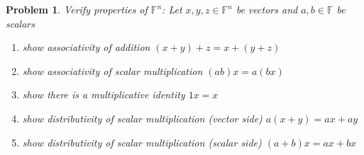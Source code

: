 \documentclass{article}
\theoremstyle{problemstyle}
\newtheorem{problem}{Problem}
\theoremstyle{problemstyle}
\begin{document}
\begin{problem}
Verify properties of $\mathbb{F}^n$: 
Let $x,y,z\in\mathbb{F}^n$ be vectors and $a,b\in\mathbb{F}$ be scalars
\begin{enumerate}
\item show associativity of addition $(x+y)+z = x+(y+z)$
\item show associativity of scalar multiplication $(ab)x = a(bx)$
\item show there is a multiplicative identity $1x=x$ 
\item show distributivity of scalar multiplication (vector side) $a(x+y) = ax + ay$
\item show distributivity of scalar multiplication (scalar side)  $(a+b)x = ax + bx$
\end{enumerate}
\end{problem}
\end{document}
